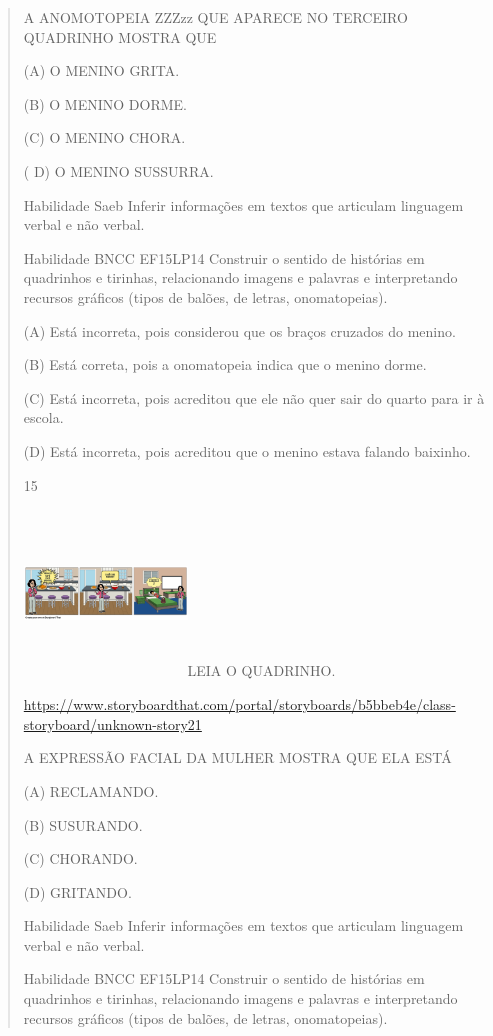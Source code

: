 {{{{\begin{verse}
{{\begin{escolha}
{{{{{A ANOMOTOPEIA ZZZzz QUE APARECE NO TERCEIRO QUADRINHO MOSTRA QUE

(A) O MENINO GRITA.

(B) O MENINO DORME.

(C) O MENINO CHORA.

( D) O MENINO SUSSURRA.

\protect\hypertarget{_Hlk129336975}{}{}Habilidade Saeb Inferir
informações em textos que articulam linguagem verbal e não verbal.

Habilidade BNCC EF15LP14 Construir o sentido de histórias em quadrinhos
e tirinhas, relacionando imagens e palavras e interpretando recursos
gráficos (tipos de balões, de letras, onomatopeias).

(A) Está incorreta, pois considerou que os braços cruzados do menino.

(B) Está correta, pois a onomatopeia indica que o menino dorme.

(C) Está incorreta, pois acreditou que ele não quer sair do quarto para
ir à escola.

(D) Está incorreta, pois acreditou que o menino estava falando baixinho.

\num{15}

\includegraphics[width=1.70556in,height=1.74444in]{media/image146.png}LEIA
O QUADRINHO.

\url{https://www.storyboardthat.com/portal/storyboards/b5bbeb4e/class-storyboard/unknown-story21}

A EXPRESSÃO FACIAL DA MULHER MOSTRA QUE ELA ESTÁ

(A) RECLAMANDO.

(B) SUSURANDO.

(C) CHORANDO.

(D) GRITANDO.

Habilidade Saeb Inferir informações em textos que articulam linguagem
verbal e não verbal.

Habilidade BNCC EF15LP14 Construir o sentido de histórias em quadrinhos
e tirinhas, relacionando imagens e palavras e interpretando recursos
gráficos (tipos de balões, de letras, onomatopeias).

}}}}}
\end{escolha}}}
\end{verse}}}}}
